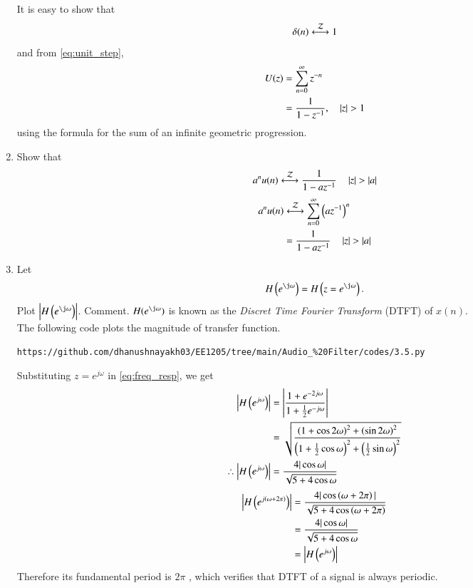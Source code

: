 \documentclass[journal,12pt,twocolumn]{IEEEtran}
\theoremstyle{remark}
\begin{document}
\begin{enumerate}[label=\thesection.\arabic*]
\solution It is easy to show that
\begin{equation}
\delta(n) \system{Z} 1
\end{equation}
and from \eqref{eq:unit_step},
\begin{align}
U(z) &= \sum _{n= 0}^{\infty}z^{-n}
\\
&=\frac{1}{1-z^{-1}}, \quad \left\vert z\right\vert > 1
\end{align}
using the formula for the sum of an infinite geometric progression.

\item Show that 
\begin{equation}
    a^nu(n) \system{Z} \frac{1}{1-az^{-1}} \quad \abs{z} > \abs{a} \label{eq:anun}
\end{equation}
\solution 
\begin{align}
	a^nu(n) &\system{Z} \sum_{n = 0}^{\infty}\brak{az^{-1}}^n \\
			&= \frac{1}{1-az^{-1}} \quad \abs{z} > \abs{a}
\end{align}

\item 
Let
\begin{equation}
    H\brak{e^{\j \omega}} = H\brak{z = e^{\j \omega}}.
\end{equation}
Plot $\abs{H\brak{e^{\j \omega}}}$.  Comment.  $H(e^{\j \omega})$ is known as the {\em Discret Time Fourier Transform} (DTFT) of $x(n)$.\\

\solution The following code plots the magnitude of transfer function.
\begin{lstlisting}
https://github.com/dhanushnayakh03/EE1205/tree/main/Audio_%20Filter/codes/3.5.py
\end{lstlisting}
Substituting $z = e^{j \omega}$ in \eqref{eq:freq_resp}, we get
\begin{align}
	\left\vert H\left(e^{j\omega}\right)\right\vert &= \left\vert\frac{1 + e^{-2j\omega}}{1 + \frac{1}{2}e^{-j\omega}}\right\vert \\
	&= \sqrt{\frac{\left(1 + \cos{2\omega}\right)^2 + \left(\sin{2\omega}\right)^2}{\left(1 + \frac{1}{2}\cos{\omega}\right)^2 + \left(\frac{1}{2}\sin{\omega}\right)^2}}\\
	\therefore \left\vert H\left(e^{j\omega}\right)\right\vert &= \frac{4|\cos{\omega}|}{\sqrt{5 + 4\cos{\omega}}}
\end{align}
\begin{align}
	\left\vert H\left(e^{j\left(\omega + 2\pi\right)}\right)\right\vert &= \frac{4|\cos\left(\omega + 2\pi\right)|}{\sqrt{5 + 4\cos\left(\omega + 2\pi\right)}} \\
	&= \frac{4|\cos{\omega}|}{\sqrt{5 + 4\cos{\omega}}} \\
	&= \left\vert H\left(e^{j\omega}\right)\right\vert	
\end{align}
Therefore its fundamental period is $2\pi$ , which verifies that DTFT of a signal is always periodic.


\end{enumerate}
\end{document}
